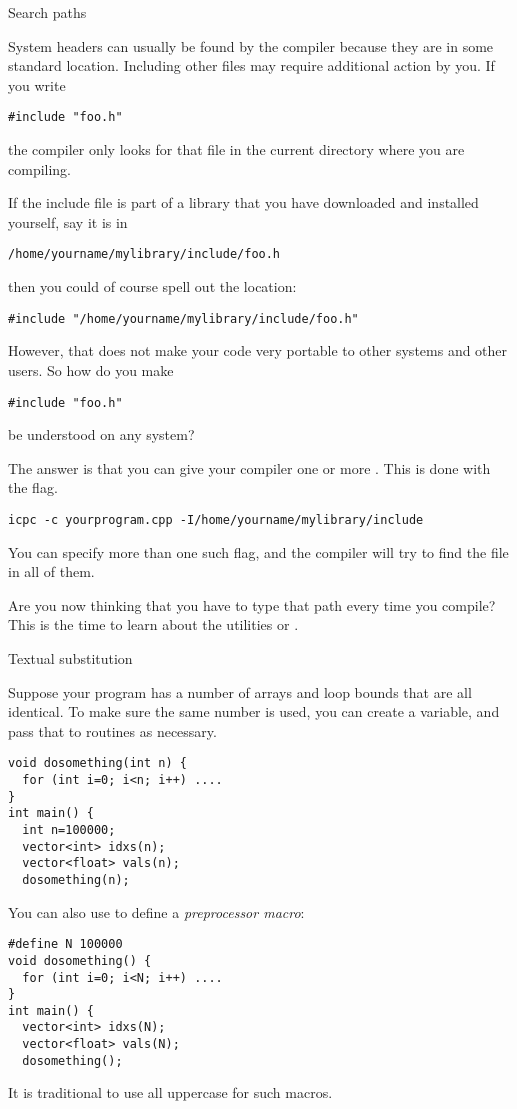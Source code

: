  {Search paths}

System headers can usually be found by the compiler because they
are in some standard location.
Including other files may require additional action by you.
If you write
\begin{lstlisting}
#include "foo.h"
\end{lstlisting}
the compiler only looks for that file in the current directory
where you are compiling.

If the include file is part of a library that you have downloaded
and installed yourself, say it is in
\begin{verbatim}
/home/yourname/mylibrary/include/foo.h
\end{verbatim}
then you could of course spell out the location:
\begin{lstlisting}
#include "/home/yourname/mylibrary/include/foo.h"
\end{lstlisting}
However, that does not make your code very portable to other systems
and other users.
So how do you make
\begin{lstlisting}
#include "foo.h"
\end{lstlisting}
be understood on any system?

The answer is that you can give your compiler one or more .
This is done with the  flag.
\begin{verbatim}
icpc -c yourprogram.cpp -I/home/yourname/mylibrary/include
\end{verbatim}
You can specify more than one such flag, and the compiler will try to find
the  file in all of them.

Are you now thinking that you have to type that path every time you compile?
This is the time to learn about the utilities
 
or  .


 {Textual substitution}

Suppose your program has a number of arrays and loop bounds that are
all identical. To make sure the same number is used, you can create a
variable, and pass that to routines as necessary.
\begin{lstlisting}
void dosomething(int n) {
  for (int i=0; i<n; i++) ....
}
int main() {
  int n=100000;
  vector<int> idxs(n);
  vector<float> vals(n);
  dosomething(n);
\end{lstlisting}
You can also use  to define a
\emph{preprocessor macro}:
\begin{lstlisting}
#define N 100000
void dosomething() {
  for (int i=0; i<N; i++) ....
}
int main() {
  vector<int> idxs(N);
  vector<float> vals(N);
  dosomething();
\end{lstlisting}
It is traditional to use all uppercase for such macros.

